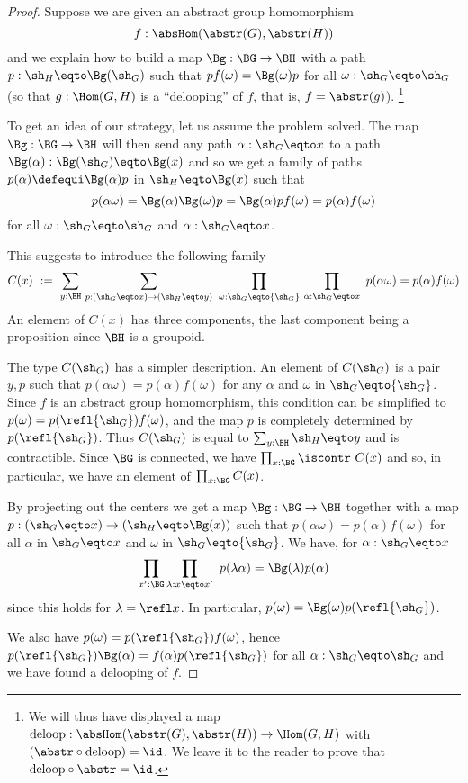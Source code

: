 \begin{proof}
  Suppose we are given an abstract group homomorphism
$$f:\absHom(\abstr(G),\abstr(H))$$
and we explain how to build a map $\Bg:\BG \rightarrow \BH$ with
a path $p:\sh_H \eqto \Bg(\sh_G)$ such that $p f(\omega) = \Bg(\omega) p$
for all $\omega:\sh_G \eqto \sh_G$ (so that $g:\Hom(G,H)$ is a ``delooping'' of $f$, 
that is, $f=\abstr(g)$).%
\footnote{We will thus have displayed a map
$\mathrm{deloop}:\absHom(\abstr(G),\abstr(H))\to\Hom(G,H)$ with 
$({\abstr}\circ\mathrm{deloop})=\id$. We leave it to the reader 
to prove that $\mathrm{deloop}\circ{\abstr}=\id$. }

To get an idea of our strategy, let us assume the problem solved. The map $\Bg:\BG\rightarrow \BH$
will then send any path $\alpha:\sh_G \eqto x$ to a path $\Bg(\alpha):\Bg(\sh_G) \eqto \Bg(x)$
and so we get a family of paths $p(\alpha) \defequi \Bg(\alpha) p$ in ${\sh_H} \eqto \Bg(x)$ such that
$$p(\alpha\omega) = \Bg(\alpha)\Bg(\omega)p
  = \Bg(\alpha)pf(\omega) = p(\alpha)f(\omega)$$
for all $\omega:\sh_G \eqto \sh_G$ and $\alpha : \sh_G \eqto x$.

This suggests to introduce the following family
$$
C(x)~:=~ \sum_{y:\BH}\,\sum_{p:(\sh_G \eqto x)\rightarrow (\sh_H \eqto y)}~\prod_{\omega:\sh_G \eqto {\sh_G}}\,\prod_{\alpha:\sh_G \eqto x}~
 p(\alpha\omega) = p(\alpha)f(\omega)
$$
 An element of $C(x)$ has three components, the last component being
 a proposition since $\BH$ is a groupoid.

 The type $C({\sh_G})$ has a simpler description. An element of $C({\sh_G})$ is
 a pair $y,p$ such that $p(\alpha\omega) = p(\alpha)f(\omega)$ for
 any $\alpha$ and $\omega$ in $\sh_G \eqto {\sh_G}$.
 Since $f$ is an abstract group homomorphism, this condition
 can be simplified to $p(\omega) = p(\refl{\sh_G})f(\omega)$, and the map $p$
 is completely determined by $p(\refl{\sh_G})$.
 Thus $C({\sh_G})$ is equal to $\sum_{y:\BH}\sh_H \eqto y$ and is contractible.
 Since $\BG$ is connected, we have
 $\prod_{x:\BG}\iscontr~ C(x)$
 and so, in particular, we have an element of $\prod_{x:\BG}C(x)$.

 By projecting out the centers we get a map $\Bg:\BG\rightarrow \BH$
 together with a map $p:({\sh_G}\eqto x)\rightarrow ({\sh_H} \eqto \Bg(x))$ 
 such that $p (\alpha\omega) = p(\alpha) f(\omega)$
 for all $\alpha$ in $\sh_G \eqto x$ and $\omega$ in $\sh_G \eqto {\sh_G}$.
We have, for $\alpha:\sh_G \eqto x$
$$\prod_{x':\BG}\prod_{\lambda:x\eqto x'}~p(\lambda\alpha) = \Bg(\lambda)p(\alpha)$$
since this holds for $\lambda = \refl x$.
In particular, $p(\omega) = \Bg(\omega)p(\refl{\sh_G})$.

We also have $p(\omega) = p(\refl{\sh_G})f(\omega)$, hence
$p(\refl{\sh_G})\Bg(\alpha) =  f(\alpha)p(\refl{\sh_G})$
for all $\alpha:\sh_G\eqto \sh_G$ and we have found a delooping of $f$.
\end{proof}


